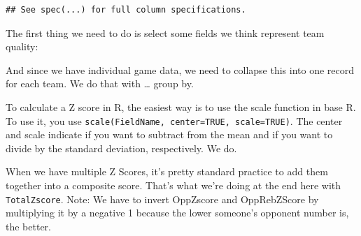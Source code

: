 \documentclass[]{book}
\newenvironment{Shaded}{\begin{snugshade}}{\end{snugshade}}
\newcommand{\DataTypeTok}[1]{\textcolor[rgb]{0.13,0.29,0.53}{#1}}
\newcommand{\KeywordTok}[1]{\textcolor[rgb]{0.13,0.29,0.53}{\textbf{#1}}}
\newcommand{\NormalTok}[1]{#1}
\newcommand{\OperatorTok}[1]{\textcolor[rgb]{0.81,0.36,0.00}{\textbf{#1}}}
\newcommand{\StringTok}[1]{\textcolor[rgb]{0.31,0.60,0.02}{#1}}
\begin{document}
\begin{verbatim}
## See spec(...) for full column specifications.
\end{verbatim}

The first thing we need to do is select some fields we think represent team quality:

\begin{Shaded}
\end{Shaded}

And since we have individual game data, we need to collapse this into one record for each team. We do that with \ldots{} group by.

\begin{Shaded}
\end{Shaded}

To calculate a Z score in R, the easiest way is to use the scale function in base R. To use it, you use \texttt{scale(FieldName,\ center=TRUE,\ scale=TRUE)}. The center and scale indicate if you want to subtract from the mean and if you want to divide by the standard deviation, respectively. We do.

When we have multiple Z Scores, it's pretty standard practice to add them together into a composite score. That's what we're doing at the end here with \texttt{TotalZscore}. Note: We have to invert OppZscore and OppRebZScore by multiplying it by a negative 1 because the lower someone's opponent number is, the better.
\end{document}

